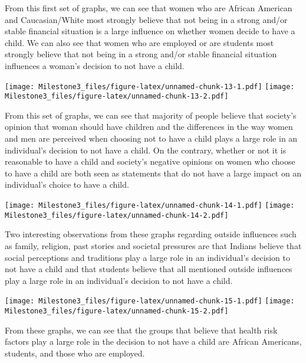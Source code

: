 \documentclass[
]{article}
\begin{document}
From this first set of graphs, we can see that women who are African
American and Caucasian/White most strongly believe that not being in a
strong and/or stable financial situation is a large influence on whether
women decide to have a child. We can also see that women who are
employed or are students most strongly believe that not being in a
strong and/or stable financial situation influences a woman's decision
to not have a child.

\texttt{[image: Milestone3\_files/figure-latex/unnamed-chunk-13-1.pdf]}
\texttt{[image: Milestone3\_files/figure-latex/unnamed-chunk-13-2.pdf]}

From this set of graphs, we can see that majority of people believe that
society's opinion that woman should have children and the differences in
the way women and men are perceived when choosing not to have a child
plays a large role in an individual's decision to not have a child. On
the contrary, whether or not it is reasonable to have a child and
society's negative opinions on women who choose to have a child are both
seen as statements that do not have a large impact on an individual's
choice to have a child.

\texttt{[image: Milestone3\_files/figure-latex/unnamed-chunk-14-1.pdf]}
\texttt{[image: Milestone3\_files/figure-latex/unnamed-chunk-14-2.pdf]}

Two interesting observations from these graphs regarding outside
influences such as family, religion, past stories and societal pressures
are that Indians believe that social perceptions and traditions play a
large role in an individual's decision to not have a child and that
students believe that all mentioned outside influences play a large role
in an individual's decision to not have a child.

\texttt{[image: Milestone3\_files/figure-latex/unnamed-chunk-15-1.pdf]}
\texttt{[image: Milestone3\_files/figure-latex/unnamed-chunk-15-2.pdf]}

From these graphs, we can see that the groups that believe that health
risk factors play a large role in the decision to not have a child are
African Americans, students, and those who are employed.
\end{document}
